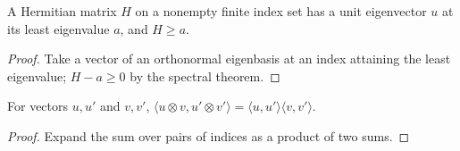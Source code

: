 \begin{theorem}
    \label{thm:hamiltonians_least_eigenvector}
    \leanok
    A Hermitian matrix $H$ on a nonempty finite index set has a unit eigenvector
    $u$ at its least eigenvalue $a$, and $H\ge a$.
\end{theorem}
\begin{proof}\leanok
    Take a vector of an orthonormal eigenbasis at an index attaining the least
    eigenvalue; $H-a\ge0$ by the spectral theorem.
\end{proof}

\begin{theorem}
    \label{thm:hamiltonians_product_vector_inner}
    \leanok
    For vectors $u,u'$ and $v,v'$,
    $\langle u\otimes v,u'\otimes v'\rangle=\langle u,u'\rangle\langle v,v'\rangle$.
\end{theorem}
\begin{proof}\leanok
    Expand the sum over pairs of indices as a product of two sums.
\end{proof}

